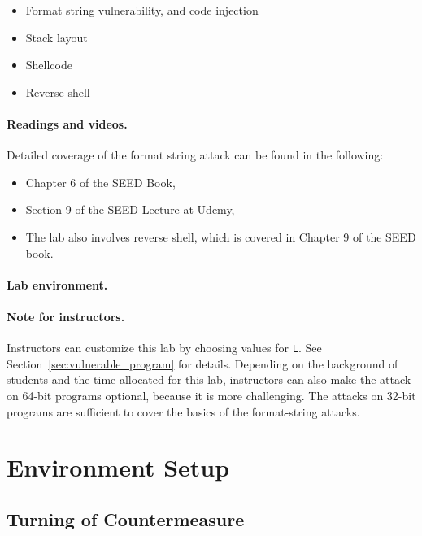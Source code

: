 \begin{itemize}[noitemsep]
\item Format string vulnerability, and code injection
\item Stack layout
\item Shellcode 
\item Reverse shell 
\end{itemize}


\paragraph{Readings and videos.}
Detailed coverage of the format string attack can be found in the following:

\begin{itemize}
\item Chapter 6 of the SEED Book, \seedbook
\item Section 9 of the SEED Lecture at Udemy, \seedcsvideo
\item The lab also involves reverse shell, which is covered in Chapter 9 of the SEED book.
\end{itemize}


\paragraph{Lab environment.} \seedenvironmentC

\paragraph{Note for instructors.}
Instructors can customize this lab by choosing values
for \texttt{L}. See Section~\ref{sec:vulnerable_program} for details.
Depending on the background of students and the time allocated
for this lab, instructors can also make the
attack on 64-bit programs optional, because it is 
more challenging. The attacks on 32-bit programs are sufficient
to cover the basics of the format-string attacks.

\section{Environment Setup} 


\subsection{Turning of Countermeasure} 

